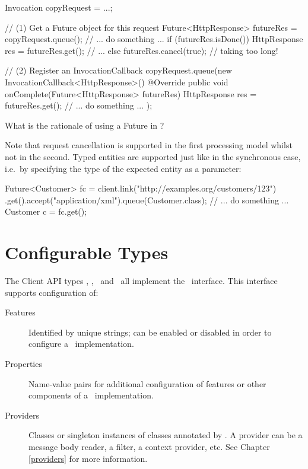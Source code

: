 \begin{listing}{1}
Invocation copyRequest = ...;

// (1) Get a Future object for this request
Future<HttpResponse> futureRes = copyRequest.queue();
// ... do something ...
if (futureRes.isDone()) {
    HttpResponse res = futureRes.get();
    // ...
} else {
    futureRes.cancel(true);        // taking too long!
}

// (2) Register an InvocationCallback
copyRequest.queue(new InvocationCallback<HttpResponse>() {
    @Override
    public void onComplete(Future<HttpResponse> futureRes) { 
        HttpResponse res = futureRes.get();
        // ... do something ... 
    }
});
\end{listing}

\begin{ednote}
What is the rationale of using a Future in ?
\end{ednote}

Note that request cancellation is supported in the first processing model whilst not in the second. Typed entities are supported just like in the synchronous case, i.e.~by specifying the type of the expected entity as a parameter:

\begin{listing}{1}
Future<Customer> fc = client.link("http://examples.org/customers/123")
    .get().accept("application/xml").queue(Customer.class);
// ... do something ...
Customer c = fc.get();
\end{listing}

\section{Configurable Types}
\label{configurable_types}

The Client API types \Client, \ClientConfiguration, \Link\ and \Invocation\ all implement the \Configurable\ interface. This interface supports configuration of:

\begin{description}
\item [Features] Identified by unique strings; can be enabled or disabled in order to configure a \jaxrs\ implementation.
\item [Properties] Name-value pairs for additional configuration of features or other components of a \jaxrs\ implementation.
\item [Providers] Classes or singleton instances of classes annotated by \Provider. A provider can be a message body reader, a filter, a context provider, etc. See Chapter \ref{providers} for more information.
\end{description}

